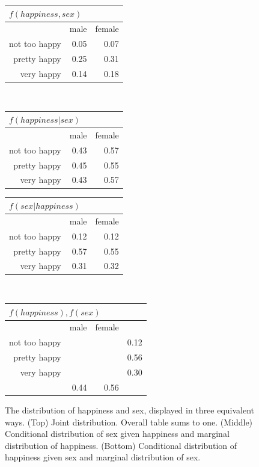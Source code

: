 \documentclass[journal]{vgtc}
\begin{document}
\begin{figure}[ht]
  \begin{tabular*}{0.5\linewidth}{rrr}
\multicolumn{3}{l}{$f(happiness, sex)$}\\
  \toprule
  & male & female \\ 
  \midrule
  not too happy & 0.05 & 0.07 \\ 
  pretty happy & 0.25 & 0.31 \\ 
  very happy & 0.14 & 0.18 \\ 
  \bottomrule
  \end{tabular*}
  \\[1em]

 
  \begin{tabular*}{0.48\linewidth}{rrr}
\multicolumn{3}{l}{$f(happiness| sex)$}\\
  \toprule
  & male & female \\
  \midrule
  not too happy & 0.43 & 0.57 \\
  pretty happy & 0.45 & 0.55 \\ 
  very happy & 0.43 & 0.57 \\
  \bottomrule
  \end{tabular*}
%
\hspace{1em}
  \begin{tabular*}{0.48\linewidth}{rrr}
\multicolumn{3}{l}{ $f(sex|happiness)$}\\
  \toprule
  & male & female \\ 
  \midrule
  not too happy & 0.12 & 0.12 \\ 
  pretty happy & 0.57 & 0.55 \\ 
  very happy & 0.31 & 0.32 \\
  \bottomrule
  \end{tabular*}
  \\[1em]

  \begin{tabular}{rrrr}
\multicolumn{3}{l}{$f(happiness), f(sex)$}\\
  \toprule
  & male & female & \\ 
  \midrule
  not too happy & & & 0.12 \\ 
  pretty happy & & & 0.56 \\ 
  very happy & & & 0.30 \\
  & 0.44 & 0.56 \\ 
  \bottomrule
  \end{tabular}

  \caption{The distribution of happiness and sex, displayed in three equivalent ways.  (Top) Joint distribution. Overall table sums to one. (Middle) Conditional distribution of sex given happiness and marginal distribution of happiness. (Bottom) Conditional distribution of happiness given sex and marginal distribution of sex.}
  \label{fig:2d-table}
\end{figure}
\end{document}
